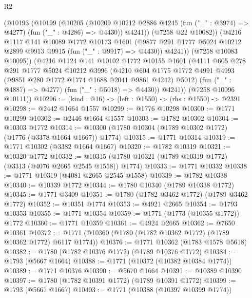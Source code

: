\begin{lexlean}{R2}
\begin{coremodule}
            (@10193
              (@10199
                (@10205
                  (@10209
                    @10212
                    @2886
                    @4245
                    (fun ("_" : @3974) => @4277)
                    (fun ("_" : @4286) => @4430))
                  @4241))
              (@7258 @22 @10082))
            (@4216
              @1117
              @141
              @10089
              @1772
              @10173
              @1601
              (@9877 @291 @1777 @5024 @10212 @2899 @9913 @9915 (fun ("_" : @9917) => @4430))
              @4241))
          (@7258 @10083 @10095))
        (@4216
          @1124
          @141
          @10102
          @1772
          @10155
          @1601
          (@4111
            @605
            @278
            @291
            @1777
            @5024
            @10212
            @3996
            (@4210
              @604
              @1775
              @1772
              @4991
              @4993
              (@9851 @280 @1772 @1774 @1688 @2041 @9861 @4242)
              @5012)
            (fun ("_" : @4887) => @4277)
            (fun ("_" : @5018) => @4430))
          @4241))
      (@7258 @10096 @10111))
@10296 := (kind : @16) -> (left : @1550) -> (rhs : @1550) -> @2391
@10298 := @2442 @1664 @1557
@10299 := @1776 @10298
@10300 := @1771 @10299
@10302 := @2446 @1664 @1557
@10303 := @1782 @10302
@10304 := @10303 @1772
@10314 := @10300 (@1780 @10304 (@1789 @10302 @1772) (@1776 (@3378 @1664 @1667)) @1774)
@10315 := @1771 @10314
@10319 := @1771 @10302 (@3382 @1664 @1667)
@10320 := @1782 @10319
@10321 := @10320 @1772
@10332 := @10315 (@1780 @10321 (@1789 @10319 @1772) (@3313 (@4076 @2665 @2545 @1558)) @1774)
@10333 := @1771 @10332
@10338 := @1771 @10319 (@4081 @2665 @2545 @1558)
@10339 := @1782 @10338
@10340 := @10339 @1772
@10344 := @1780 @10340 (@1789 @10338 @1772)
@10345 := @1771 @3409
@10351 := @1780 (@1782 @3462 @1772) (@1789 @3462 @1772)
@10352 := @10351 @1774
@10353 := @4921 @2665
@10354 := @1793 @10353
@10355 := @1771 @10354
@10359 := @1771 (@1773 (@10355 @1772)) @1772
@10360 := @1771 @10359
@10361 := @4924 @2665
@10362 := @7650 @10361
@10372 := @1771 (@10360 (@1780 (@1782 @10362 @1772) (@1789 @10362 @1772) @6117 @1774))
@10376 := @1771 @10362 (@1783 @1578 @5618)
@10382 := @1780 (@1782 @10376 @1772) (@1789 @10376 @1772)
@10384 := @1793 (@5667 @1664)
@10388 := @1771 (@10372 (@10382 @10384 @1774))
@10389 := @1771 @10376
@10390 := @5670 @1664
@10391 := @10389 @10390
@10397 := @1780 (@1782 @10391 @1772) (@1789 @10391 @1772)
@10399 := @1793 (@5667 @1667)
@10403 := @1771 (@10388 (@10397 @10399 @1774))

\end{coremodule}
\end{lexlean}
